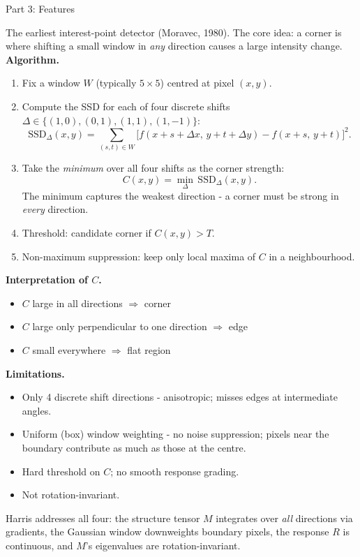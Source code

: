 \documentclass[letterpaper]{article}
\begin{document}
\begin{notes}{Part 3: Features}

The earliest interest-point detector (Moravec, 1980). The core idea: a corner is where shifting a small window in \emph{any} direction causes a large intensity change.\\

\textbf{Algorithm.}
\begin{enumerate}
    \item Fix a window $W$ (typically $5\times5$) centred at pixel $(x,y)$.
    \item Compute the SSD for each of four discrete shifts $\Delta \in \{(1,0),(0,1),(1,1),(1,-1)\}$:
    $$\mathrm{SSD}_\Delta(x,y) = \sum_{(s,t)\in W}\bigl[f(x{+}s{+}\Delta x,\,y{+}t{+}\Delta y) - f(x{+}s,\,y{+}t)\bigr]^2.$$
    \item Take the \emph{minimum} over all four shifts as the corner strength:
    $$C(x,y) = \min_{\Delta}\,\mathrm{SSD}_\Delta(x,y).$$
    The minimum captures the weakest direction - a corner must be strong in \emph{every} direction.
    \item Threshold: candidate corner if $C(x,y) > T$.
    \item Non-maximum suppression: keep only local maxima of $C$ in a neighbourhood.
\end{enumerate}

\textbf{Interpretation of $C$.}
\begin{itemize}
    \item $C$ large in all directions $\Rightarrow$ corner
    \item $C$ large only perpendicular to one direction $\Rightarrow$ edge
    \item $C$ small everywhere $\Rightarrow$ flat region
\end{itemize}

\textbf{Limitations.}
\begin{itemize}
    \item Only 4 discrete shift directions - anisotropic; misses edges at intermediate angles.
    \item Uniform (box) window weighting - no noise suppression; pixels near the boundary contribute as much as those at the centre.
    \item Hard threshold on $C$; no smooth response grading.
    \item Not rotation-invariant.
\end{itemize}
Harris addresses all four: the structure tensor $M$ integrates over \emph{all} directions via gradients, the Gaussian window downweights boundary pixels, the response $R$ is continuous, and $M$'s eigenvalues are rotation-invariant.



\end{notes}
\end{document}
